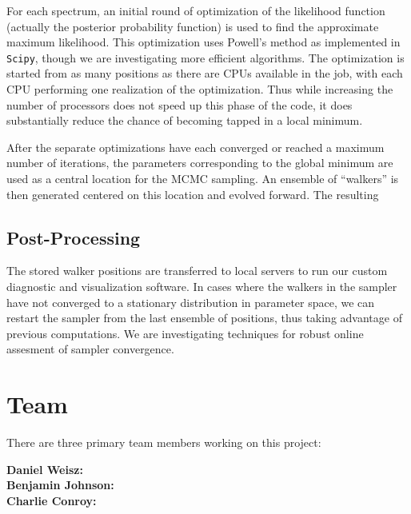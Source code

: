 \documentclass[11pt,preprint]{aastex}
\begin{document}
For each spectrum, an initial round of optimization of the likelihood function (actually the posterior probability function) is used to find the approximate maximum likelihood. 
This optimization uses Powell's method as implemented in \texttt{Scipy}, though we are investigating more efficient algorithms. 
The optimization is started from as many positions as there are CPUs available in the job, with each CPU  performing one realization of the optimization.  
Thus while increasing the number of processors does not speed up this phase of the code, it does substantially reduce the chance of becoming tapped in a local minimum.

After the separate optimizations have each converged or reached a maximum number of iterations, the parameters corresponding to the global minimum are used as a central location for the MCMC sampling.
An ensemble of ``walkers'' is then generated centered on this location and evolved forward.  
The resulting 

\subsection{Post-Processing}
The stored walker positions are transferred to local servers to run our custom diagnostic and visualization software.  
In cases where the walkers in the sampler have not converged to a stationary distribution in parameter space, we can restart the sampler from the last ensemble of positions, thus taking advantage of previous computations.  
We are investigating techniques for robust online assesment of sampler convergence.







\clearpage

\section{Team}

There are three primary team members working on this project:

\textbf{Daniel Weisz:} \\

\textbf{Benjamin Johnson:} \\

\textbf{Charlie Conroy:}





\end{document}
